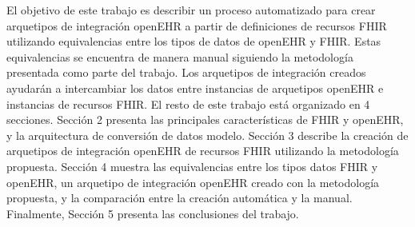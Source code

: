 El objetivo de este trabajo es describir un proceso automatizado para crear arquetipos de integración openEHR a partir de definiciones de recursos FHIR utilizando equivalencias entre los tipos de datos de openEHR y FHIR. Estas equivalencias se encuentra de manera manual siguiendo la metodología presentada como parte del trabajo. Los arquetipos de integración creados ayudarán a intercambiar los datos entre instancias de arquetipos openEHR e instancias de recursos FHIR. El resto de este trabajo está organizado en 4 secciones. Sección 2 presenta las principales características de FHIR y openEHR, y la arquitectura de conversión de datos modelo. Sección 3 describe la creación de arquetipos de integración openEHR de recursos FHIR utilizando la metodología propuesta. Sección 4 muestra las equivalencias entre los tipos datos FHIR y openEHR, un arquetipo de integración openEHR creado con la metodología propuesta, y la comparación entre la creación automática y la manual. Finalmente, Sección 5 presenta las conclusiones del trabajo.
